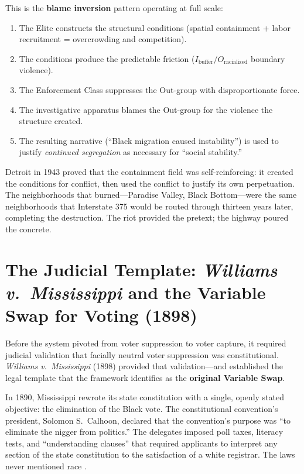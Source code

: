 \documentclass[12pt,openany]{book}
\providecommand{\tightlist}{\setlength{\itemsep}{0pt}\setlength{\parskip}{0pt}}
\begin{document}
This is the \textbf{blame inversion} pattern operating at full scale:

\begin{enumerate}
  \tightlist
  \item The Elite constructs the structural conditions (spatial containment + labor recruitment = overcrowding and competition).
  \item The conditions produce the predictable friction ($I_{\text{buffer}} / O_{\text{racialized}}$ boundary violence).
  \item The Enforcement Class suppresses the Out-group with disproportionate force.
  \item The investigative apparatus blames the Out-group for the violence the structure created.
  \item The resulting narrative (``Black migration caused instability'') is used to justify \textit{continued segregation} as necessary for ``social stability.''
\end{enumerate}

Detroit in 1943 proved that the containment field was self-reinforcing: it created the conditions for conflict, then used the conflict to justify its own perpetuation. The neighborhoods that burned---Paradise Valley, Black Bottom---were the same neighborhoods that Interstate 375 would be routed through thirteen years later, completing the destruction. The riot provided the pretext; the highway poured the concrete.

\section{The Judicial Template: \textit{Williams v.\ Mississippi} and the Variable Swap for Voting (1898)}

Before the system pivoted from voter suppression to voter capture, it required judicial validation that facially neutral voter suppression was constitutional. \textit{Williams v.\ Mississippi} (1898) provided that validation---and established the legal template that the framework identifies as the \textbf{original Variable Swap}.

In 1890, Mississippi rewrote its state constitution with a single, openly stated objective: the elimination of the Black vote. The constitutional convention's president, Solomon S.\ Calhoon, declared that the convention's purpose was ``to eliminate the nigger from politics.'' The delegates imposed poll taxes, literacy tests, and ``understanding clauses'' that required applicants to interpret any section of the state constitution to the satisfaction of a white registrar. The laws never mentioned race \cite{williams_v_miss}.
\end{document}
